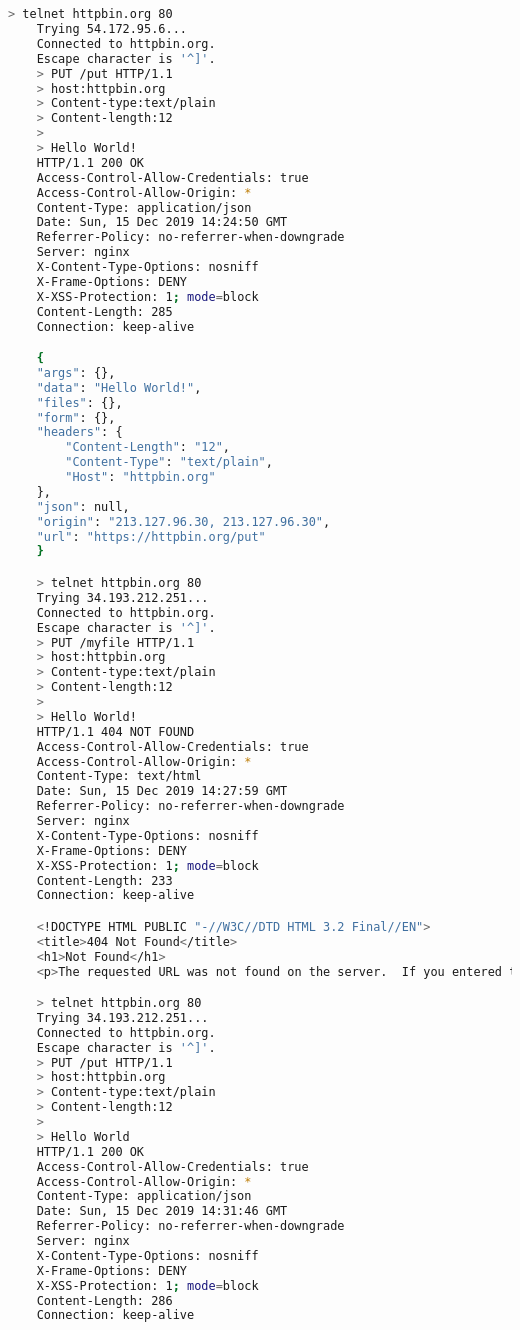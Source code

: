 \documentclass{article}
\begin{document}
	\section{}
	\begin{lstlisting}[language=bash]
	> telnet httpbin.org 80
	Trying 54.172.95.6...
	Connected to httpbin.org.
	Escape character is '^]'.
	> PUT /put HTTP/1.1
	> host:httpbin.org
	> Content-type:text/plain
	> Content-length:12
	>
	> Hello World!
	HTTP/1.1 200 OK
	Access-Control-Allow-Credentials: true
	Access-Control-Allow-Origin: *
	Content-Type: application/json
	Date: Sun, 15 Dec 2019 14:24:50 GMT
	Referrer-Policy: no-referrer-when-downgrade
	Server: nginx
	X-Content-Type-Options: nosniff
	X-Frame-Options: DENY
	X-XSS-Protection: 1; mode=block
	Content-Length: 285
	Connection: keep-alive

	{
	"args": {}, 
	"data": "Hello World!", 
	"files": {}, 
	"form": {}, 
	"headers": {
		"Content-Length": "12", 
		"Content-Type": "text/plain", 
		"Host": "httpbin.org"
	}, 
	"json": null, 
	"origin": "213.127.96.30, 213.127.96.30", 
	"url": "https://httpbin.org/put"
	}

	> telnet httpbin.org 80
	Trying 34.193.212.251...
	Connected to httpbin.org.
	Escape character is '^]'.
	> PUT /myfile HTTP/1.1
	> host:httpbin.org
	> Content-type:text/plain
	> Content-length:12
	>
	> Hello World!
	HTTP/1.1 404 NOT FOUND
	Access-Control-Allow-Credentials: true
	Access-Control-Allow-Origin: *
	Content-Type: text/html
	Date: Sun, 15 Dec 2019 14:27:59 GMT
	Referrer-Policy: no-referrer-when-downgrade
	Server: nginx
	X-Content-Type-Options: nosniff
	X-Frame-Options: DENY
	X-XSS-Protection: 1; mode=block
	Content-Length: 233
	Connection: keep-alive

	<!DOCTYPE HTML PUBLIC "-//W3C//DTD HTML 3.2 Final//EN">
	<title>404 Not Found</title>
	<h1>Not Found</h1>
	<p>The requested URL was not found on the server.  If you entered the URL manually please check your spelling and try again.</p>

	> telnet httpbin.org 80
	Trying 34.193.212.251...
	Connected to httpbin.org.
	Escape character is '^]'.
	> PUT /put HTTP/1.1
	> host:httpbin.org
	> Content-type:text/plain
	> Content-length:12
	>
	> Hello World
	HTTP/1.1 200 OK
	Access-Control-Allow-Credentials: true
	Access-Control-Allow-Origin: *
	Content-Type: application/json
	Date: Sun, 15 Dec 2019 14:31:46 GMT
	Referrer-Policy: no-referrer-when-downgrade
	Server: nginx
	X-Content-Type-Options: nosniff
	X-Frame-Options: DENY
	X-XSS-Protection: 1; mode=block
	Content-Length: 286
	Connection: keep-alive


\end{lstlisting}
\end{document}
